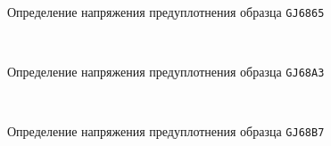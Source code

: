     \begin{figure}
        {\centering
            \small
            \hfill 
            \\
            \hfill   
            \hfill 
            }
            \caption{Определение напряжения предуплотнения образца \texttt{GJ6865}}
            \label{img:6865}
    \end{figure}
        
    \begin{figure}
        {\centering
            \small
            \hfill 
            \\
            \hfill   
            \hfill 
            }
            \caption{Определение напряжения предуплотнения образца \texttt{GJ68A3}}
            \label{img:68A3}
    \end{figure}
        
    \begin{figure}
        {\centering
            \small
            \hfill 
            \\
            \hfill   
            \hfill 
            }
            \caption{Определение напряжения предуплотнения образца \texttt{GJ68B7}}
            \label{img:68B7}
    \end{figure}